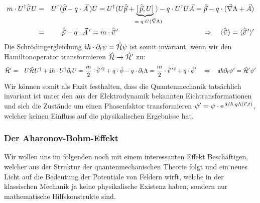 \begin{eqnarray*}
	m\cdot U^{\dagger}\hat{\vec{v}}\,U &=& U^{\dagger}(\hat{\vec{p}}-q\cdot\vec{A}\,)U = U^{\dagger}(U\hat{\vec{p}}+\!\!\!\!\!\!\!\underbrace{[\,\hat{\vec{p}},U]}_{\quad=\;q\cdot U (\vec{\nabla}\Lambda)}\!\!\!\!\!\!)-q\cdot U^{\dagger}U\vec{A} = \hat{\vec{p}} -q\cdot(\vec{\nabla}\Lambda+\vec{A}) 
	\\
	&=& \hat{\vec{p}}-q\cdot\vec{A}\,'= m\cdot\hat{\vec{v}}\,' \qquad\qquad\qquad\qquad\qquad\qquad\Rightarrow\quad\EW{\hat{\vec{v}}\,}=\EW{\hat{\vec{v}}\,'}'
\end{eqnarray*}
Die Schrödingergleichung $\I\hbar\cdot\dell_t \psi=\hat{\ham}\psi$ ist somit invariant, wenn wir den Hamiltonoperator transformieren $\hat{\mathcal H}\to\hat{\mathcal H}'$ zu:
\begin{eqnarray*}
	\hat{\ham}' &=& U\hat{\ham}U^{\dagger}+\I\hbar\cdot U^{\dagger}\partial_t U = \frac{m}{2}\cdot \hat{\vec{v}}\,'\,\!^2+q\cdot\hat{\phi}-q\cdot\dell_t\Lambda = \frac{m}{2}\cdot \hat{\vec{v}}\,'\,\!^2+q\cdot\hat{\phi}' \quad\Rightarrow\quad \I\hbar\dell_t\psi'=\hat{\ham}'\psi'
\end{eqnarray*}
Wir können somit als Fazit festhalten, dass die Quantenmechanik tatsächlich invariant ist unter den aus der Elektrodynamik bekannten Eichtransformationen und sich die Zustände um einen Phasenfaktor transformieren $\psi' =\psi\cdot\e^{\;\I/\hbar\cdot q\Lambda(\vec{r},t)}$, welcher keinen Einfluss auf die physikalischen Ergebnisse hat. 


\subsubsection{Der Aharonov-Bohm-Effekt}

Wir wollen uns im folgenden noch mit einem interessanten Effekt Beschäftigen, welcher aus der Struktur der quantenmechanischen Theorie folgt und ein neues Licht auf die Bedeutung der Potentiale von Feldern wirft, welche in der klassischen Mechanik ja keine physikalische Existenz haben, sondern nur mathematische Hilfskonstrukte sind. 

